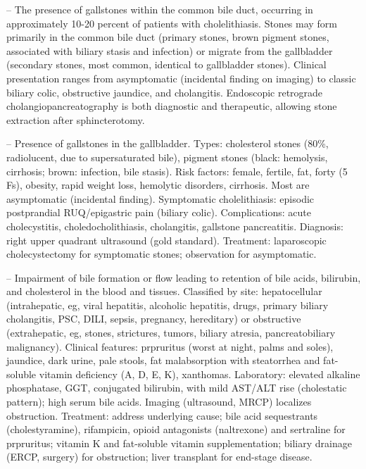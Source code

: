 -- The presence of gallstones within the common bile duct, occurring in approximately 10-20 percent of patients with cholelithiasis. Stones may form primarily in the common bile duct (primary stones, brown pigment stones, associated with biliary stasis and infection) or migrate from the gallbladder (secondary stones, most common, identical to gallbladder stones). Clinical presentation ranges from asymptomatic (incidental finding on imaging) to classic biliary colic, obstructive jaundice, and cholangitis. Endoscopic retrograde cholangiopancreatography is both diagnostic and therapeutic, allowing stone extraction after sphincterotomy.

-- Presence of gallstones in the gallbladder. Types: cholesterol stones (80\%, radiolucent, due to supersaturated bile), pigment stones (black: hemolysis, cirrhosis; brown: infection, bile stasis). Risk factors: female, fertile, fat, forty (5 Fs), obesity, rapid weight loss, hemolytic disorders, cirrhosis. Most are asymptomatic (incidental finding). Symptomatic cholelithiasis: episodic postprandial RUQ/epigastric pain (biliary colic). Complications: acute cholecystitis, choledocholithiasis, cholangitis, gallstone pancreatitis. Diagnosis: right upper quadrant ultrasound (gold standard). Treatment: laparoscopic cholecystectomy for symptomatic stones; observation for asymptomatic.

-- Impairment of bile formation or flow leading to retention of bile acids, bilirubin, and cholesterol in the blood and tissues. Classified by site: hepatocellular (intrahepatic, eg, viral hepatitis, alcoholic hepatitis, drugs, primary biliary cholangitis, PSC, DILI, sepsis, pregnancy, hereditary) or obstructive (extrahepatic, eg, stones, strictures, tumors, biliary atresia, pancreatobiliary malignancy). Clinical features: prpruritus (worst at night, palms and soles), jaundice, dark urine, pale stools, fat malabsorption with steatorrhea and fat-soluble vitamin deficiency (A, D, E, K), xanthomas. Laboratory: elevated alkaline phosphatase, GGT, conjugated bilirubin, with mild AST/ALT rise (cholestatic pattern); high serum bile acids. Imaging (ultrasound, MRCP) localizes obstruction. Treatment: address underlying cause; bile acid sequestrants (cholestyramine), rifampicin, opioid antagonists (naltrexone) and sertraline for prpruritus; vitamin K and fat-soluble vitamin supplementation; biliary drainage (ERCP, surgery) for obstruction; liver transplant for end-stage disease.

